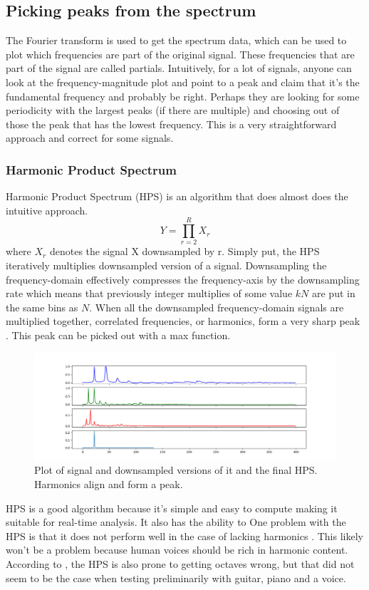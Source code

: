 \subsection{Picking peaks from the spectrum}
The Fourier transform is used to get the spectrum data, which can be used to plot which frequencies are part of the original signal. These frequencies that are part of the signal are called partials. Intuitively, for a lot of signals, anyone can look at the frequency-magnitude plot and point to a peak and claim that it's the fundamental frequency and probably be right. Perhaps they are looking for some periodicity with the largest peaks (if there are multiple) and choosing out of those the peak that has the lowest frequency. This is a very straightforward approach and correct for some signals. 

\subsubsection{Harmonic Product Spectrum}
Harmonic Product Spectrum (HPS) is an algorithm that does almost does the intuitive approach. 
$$Y = \prod_{r=2}^R X_r$$ where $X_r$ denotes the signal X downsampled by r. Simply put, the HPS iteratively multiplies downsampled version of a signal. Downsampling the frequency-domain effectively compresses the frequency-axis by the downsampling rate which means that previously integer multiplies of some value $kN$ are put in the same bins as $N$. When all the downsampled frequency-domain signals are multiplied together, correlated frequencies, or harmonics, form a very sharp peak \cite{McLeod2008}. This peak can be picked out with a max function.

\begin{figure}[ht]
    \centering
    \includegraphics[width=\textwidth]{./images/hps.png}
    \caption{Plot of signal and downsampled versions of it and the final HPS. Harmonics align and form a peak. \label{fig:hps}}
\end{figure}

HPS is a good algorithm because it's simple and easy to compute making it suitable for real-time analysis. It also has the ability to 
One problem with the HPS is that it does not perform well in the case of lacking harmonics \cite{McLeod2008}. This likely won't be a problem because human voices should be rich in harmonic content. According to \cite{Smyth2019}, the HPS is also prone to getting octaves wrong, but that did not seem to be the case when testing preliminarily with guitar, piano and a voice.

